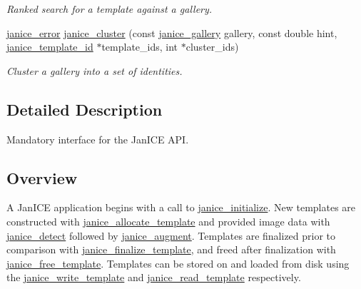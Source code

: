 \begin{DoxyCompactItemize}
\begin{DoxyCompactList}\small\item\em Ranked search for a template against a gallery. \end{DoxyCompactList}\item 
\hyperlink{group__janice_ga4873d49c1f9d6a6880dfbd485cf6ba72}{janice\+\_\+error} \hyperlink{group__janice_ga20d0206073850de0224651441c980ee7}{janice\+\_\+cluster} (const \hyperlink{group__janice_ga08feff1c2835b44332afeda80c3d0fb7}{janice\+\_\+gallery} gallery, const double hint, \hyperlink{group__janice_ga5ec62465fbbc7a92faadfefd3d20e25b}{janice\+\_\+template\+\_\+id} $\ast$template\+\_\+ids, int $\ast$cluster\+\_\+ids)
\begin{DoxyCompactList}\small\item\em Cluster a gallery into a set of identities. \end{DoxyCompactList}\end{DoxyCompactItemize}


\subsection{Detailed Description}
Mandatory interface for the Jan\+I\+C\+E A\+P\+I. 

\hypertarget{group__janice_Overview}{}\subsection{Overview}\label{group__janice_Overview}
A Jan\+I\+C\+E application begins with a call to \hyperlink{group__janice_ga099241a8ed3bab6da3247a15a471fc00}{janice\+\_\+initialize}. New templates are constructed with \hyperlink{group__janice_ga5709bc7f0fd329db20f72cac8639c328}{janice\+\_\+allocate\+\_\+template} and provided image data with \hyperlink{group__janice_ga689c273a241f8e8694468fa561a7184b}{janice\+\_\+detect} followed by \hyperlink{group__janice_gae05799e93603418e9f0df2ce4bda0301}{janice\+\_\+augment}. Templates are finalized prior to comparison with \hyperlink{group__janice_gaf4894cf8cd61aa1ec60541f11cdb6de8}{janice\+\_\+finalize\+\_\+template}, and freed after finalization with \hyperlink{group__janice_ga5fa70d9ddc0b9b74e9be28cd4772be9a}{janice\+\_\+free\+\_\+template}. Templates can be stored on and loaded from disk using the \hyperlink{group__janice_ga0d4dbc4c5af8e9be07634e5da920f51b}{janice\+\_\+write\+\_\+template} and \hyperlink{group__janice_gace5b3f84daa9349c4557f4e0c8b23a13}{janice\+\_\+read\+\_\+template} respectively.

